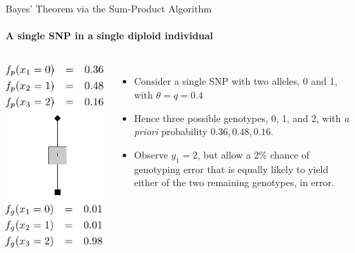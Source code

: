 \documentclass[letter,graphicx]{beamer}
\begin{document}
\begin{frame}{Bayes' Theorem via the Sum-Product Algorithm}
\framesubtitle{A single SNP in a single diploid individual}

\begin{columns}
\includegraphics[height = 0.8\textheight]{./images/single-node-sum-product-a.pdf}
\begin{itemize}
\item Consider a single SNP with two alleles, 0 and 1, with $\theta = q = 0.4$\\
\item Hence three possible genotypes, 0, 1, and 2, with {\em a priori} 
probability $0.36, 0.48, 0.16$.
\item Observe $y_1 = 2$, but allow a 2\% chance of genotyping error that is equally likely to yield either of the two remaining genotypes, in error.
\end{itemize}
\end{columns}
\end{frame}
\end{document}
